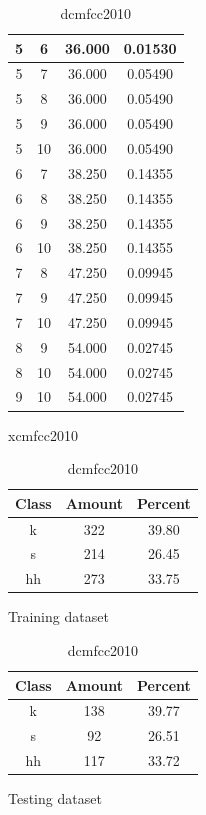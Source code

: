 \begin{table}
\begin{subtable}[tbp]{0.45\textwidth}
{\begin{tabular}{|c|c|c|c|}
 5 & 6 & 36.000 & 0.01530\\ \hline 
 5 & 7 & 36.000 & 0.05490\\ \hline 
 5 & 8 & 36.000 & 0.05490\\ \hline 
 5 & 9 & 36.000 & 0.05490\\ \hline 
 5 & 10 & 36.000 & 0.05490\\ \hline 
 6 & 7 & 38.250 & 0.14355\\ \hline 
 6 & 8 & 38.250 & 0.14355\\ \hline 
 6 & 9 & 38.250 & 0.14355\\ \hline 
 6 & 10 & 38.250 & 0.14355\\ \hline 
 7 & 8 & 47.250 & 0.09945\\ \hline 
 7 & 9 & 47.250 & 0.09945\\ \hline 
 7 & 10 & 47.250 & 0.09945\\ \hline 
 8 & 9 & 54.000 & 0.02745\\ \hline 
 8 & 10 & 54.000 & 0.02745\\ \hline 
 9 & 10 & 54.000 & 0.02745\\ \hline 

\end{tabular}
} \label{xlmfcc2010}
\caption{xcmfcc2010}
\end{subtable}

\begin{subtable}[tbp]{0.45\textwidth}
\centering
\begin{tabular}{|c|c|c|}
\hline
Class & Amount & Percent\\ \hline
k & 322 & 39.80\\ \hline
s & 214 & 26.45\\ \hline
hh & 273 & 33.75\\ \hline
\end{tabular}
\caption{Training dataset}
\end{subtable}
\hfill
\begin{subtable}[tbp]{0.45\textwidth}
\centering
\begin{tabular}{|c|c|c|}
\hline
Class & Amount & Percent\\ \hline
k & 138 & 39.77\\ \hline
s & 92 & 26.51\\ \hline
hh & 117 & 33.72\\ \hline
\end{tabular}
\caption{Testing dataset}
\end{subtable}
\hfill

\label{dlmfcc2010}

\caption{dcmfcc2010}

\end{table}\clearpage


